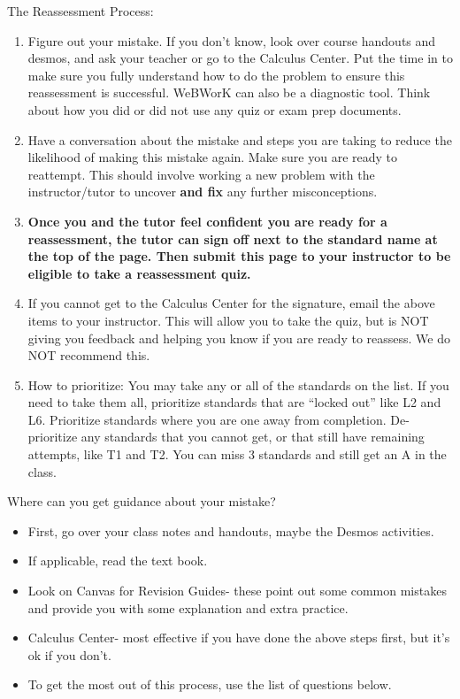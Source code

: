 \documentclass[12pt]{article}
\begin{document}
\bigskip

The Reassessment Process:
\begin{enumerate}
\item Figure out your mistake. If you don't know, look over course handouts and desmos, and ask your teacher or go to the Calculus Center. Put the time in to make sure you fully understand how to do the problem to ensure this reassessment is successful. WeBWorK can also be a diagnostic tool. Think about how you did or did not use any quiz or exam prep documents.
\item Have a conversation about the mistake and steps you are taking to reduce the likelihood of making this mistake again. Make sure you are ready to reattempt. This should involve working a new problem with the instructor/tutor to uncover \textbf{and fix} any further misconceptions.
\item \textbf{Once you and the tutor feel confident you are ready for a reassessment, the tutor can sign off next to the standard name at the top of the page. Then submit this page to your instructor to be eligible to take a reassessment quiz.}
\item If you cannot get to the Calculus Center for the signature, email the above items to your instructor. This will allow you to take the quiz, but is NOT giving you feedback and helping you know if you are ready to reassess. We do NOT recommend this.
\item How to prioritize: You may take any or all of the standards on the list. If you need to take them all, prioritize standards that are ``locked out'' like L2 and L6. Prioritize standards where you are one away from completion. De-prioritize any standards that you cannot get, or that still have remaining attempts, like T1 and T2.  You can miss 3 standards and still get an A in the class.
\end{enumerate}

\newpage

Where can you get guidance about your mistake?

\begin{itemize}
\item First, go over your class notes and handouts, maybe the Desmos activities.
\item If applicable, read the text book.
\item Look on Canvas for Revision Guides- these point out some common mistakes and provide you with some explanation and extra practice.
\item Calculus Center- most effective if you have done the above steps first, but it's ok if you don't.
\item To get the most out of this process, use the list of questions below.
\end{itemize}
\end{document}
